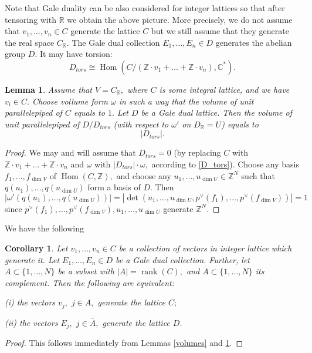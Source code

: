 \documentclass[11pt,leqno]{amsart}
\newtheorem{lemma}[theo]{Lemma}
\newtheorem{cor}[theo]{Corollary}
\numberwithin{equation}{section}
\def\R{\mathbb{R}}
\def\C{\mathbb{C}}
\def\Z{\mathbb{Z}}
\def\Hom{\operatorname{Hom}}
\newcommand{\rank}{\operatorname{rank}}
\begin{document}
Note that Gale duality can be also considered for integer lattices so that after tensoring with $\R$ we obtain the above picture.
More precisely, we do not assume that $v_1,\dots,v_n\in C$ generate the lattice $C$ but we still assume that they generate the real space $C_{\R}.$
The Gale dual collection $E_1,\dots,E_n\in D$ generates the abelian group $D.$ It may have torsion:
\begin{equation}\label{D_tors}D_{tors}\cong \Hom(C/(\Z\cdot v_1+\dots+\Z\cdot v_n),\C^*).\end{equation}

\begin{lemma}\label{vol_D_tors}Assume that $V=C_{\R},$ where $C$ is some integral lattice, and we have $v_i\in C.$ Choose vollume
form $\omega$ in such a way that the volume of unit parallelepiped of $C$ equals to $1.$ Let $D$ be a Gale dual lattice.
Then the volume of unit parallelepiped of $D/D_{tors}$ (with respect to $\omega'$ on $D_{\R}=U$) equals to
$$|D_{tors}|.$$\end{lemma}

\begin{proof}We may and will assume that $D_{tors}=0$ (by replacing $C$ with $\Z\cdot v_1+\dots+\Z\cdot v_n$ and $\omega$
with $|D_{tors}|\cdot\omega,$ according to
\eqref{D_tors}). Choose any basis $f_1,\dots,f_{\dim V}$ of $\Hom(C,\Z),$ and choose any $u_1,\dots,u_{\dim U}\in \Z^N$
such that $q(u_1),\dots,q(u_{\dim U})$ form a basis of $D.$ Then
$$|\omega'(q(u_1),\dots,q(u_{\dim U}))|=|\det(u_1,\dots,u_{\dim U},p^{\vee}(f_1),\dots,p^{\vee}(f_{\dim V}))|=1$$
since $p^{\vee}(f_1),\dots,p^{\vee}(f_{\dim V}),u_1,\dots,u_{\dim U}$
generate $\Z^N.$\end{proof}

We have the following

\begin{cor}\label{is_basis}Let $v_1,\dots,v_n\in C$ be a collection of vectors in integer lattice which generate it. Let $E_1,\dots,E_n\in D$
be a Gale dual collection. Further, let $A\subset \{1,\dots,N\}$ be a subset with $|A|=\rank\left(C\right),$ and $\overline{A}\subset \{1,\dots,N\}$
its complement. Then the following are equivalent:

(i) the vectors $v_j,$ $j\in A,$ generate the lattice $C;$

(ii) the vectors $E_j,$ $j\in \overline{A},$ generate the lattice $D.$\end{cor}

\begin{proof}This follows immediately from Lemmas \ref{volumes} and \ref{vol_D_tors}.
\end{proof}
\end{document}
